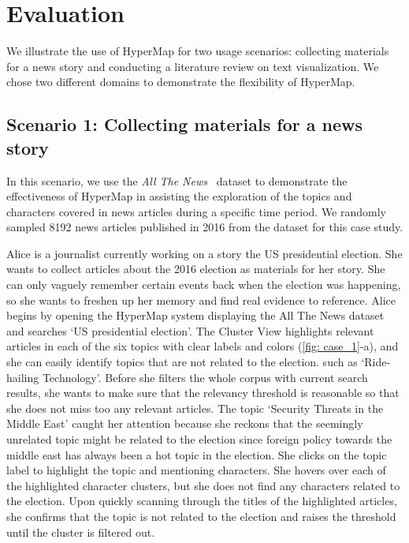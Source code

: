 \section{Evaluation}\label{sec: evaluation}
We illustrate the use of HyperMap for two usage scenarios: collecting materials for a news story and conducting a literature review on text visualization.
We chose two different domains to demonstrate the flexibility of HyperMap.
\subsection{Scenario 1: Collecting materials for a news story}
In this scenario, we use the \textit{All The News}~\cite{allthenews} dataset to demonstrate the effectiveness of HyperMap in assisting the exploration of the topics and characters covered in news articles during a specific time period.
We randomly sampled 8192 news articles published in 2016 from the dataset for this case study.

Alice is a journalist currently working on a story the US presidential election. She wants to collect articles about the 2016 election as materials for her story.
She can only vaguely remember certain events back when the election was happening, so she wants to freshen up her memory and find real evidence to reference.
Alice begins by opening the HyperMap system displaying the All The News dataset and searches `US presidential election'.
The Cluster View highlights relevant articles in each of the six topics with clear labels and colors (\autoref{fig: case_1}-a), and she can easily identify topics that are not related to the election. such as \textcolor{ride_hailing_technology}{`Ride-hailing Technology'}.
Before she filters the whole corpus with current search results, she wants to make sure that the relevancy threshold is reasonable so that she does not miss too any relevant articles.
The topic \textcolor{middle_east_threats}{`Security Threats in the Middle East'} caught her attention because she reckons that the seemingly unrelated topic might be related to the election since foreign policy towards the middle east has always been a hot topic in the election.
She clicks on the topic label to highlight the topic and mentioning characters.
She hovers over each of the highlighted character clusters, but she does not find any characters related to the election.
Upon quickly scanning through the titles of the highlighted articles, she confirms that the topic is not related to the election and raises the threshold until the cluster is filtered out.

